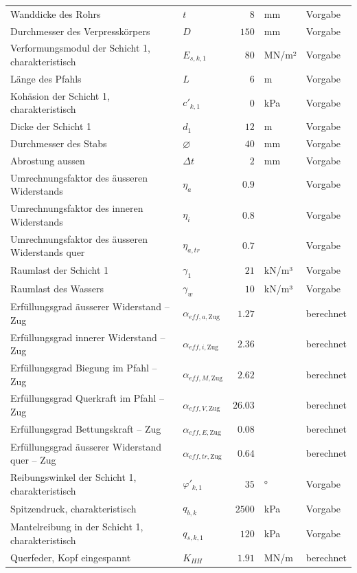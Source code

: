 \documentclass[11pt,a4paper]{article}
\begin{document}
\begin{xltabular}{\linewidth}{>{\raggedright\arraybackslash}Xlrll}
Wanddicke des Rohrs & $t$ & $8$ & mm & Vorgabe \\
Durchmesser des Verpresskörpers & $D$ & $150$ & mm & Vorgabe \\
Verformungsmodul der Schicht 1, charakteristisch & $E_{s,k,1}$ & $80$ & MN/m² & Vorgabe \\
Länge des Pfahls & $L$ & $6$ & m & Vorgabe \\
Kohäsion der Schicht 1, charakteristisch & $c'_{k,1}$ & $0$ & kPa & Vorgabe \\
Dicke der Schicht 1 & $d_{1}$ & $12$ & m & Vorgabe \\
Durchmesser des Stabs & $\varnothing$ & $40$ & mm & Vorgabe \\
Abrostung aussen & $\Delta t$ & $2$ & mm & Vorgabe \\
Umrechnungsfaktor des äusseren Widerstands & $\eta_a$ & $0.9$ &  & Vorgabe \\
Umrechnungsfaktor des inneren Widerstands & $\eta_i$ & $0.8$ &  & Vorgabe \\
Umrechnungsfaktor des äusseren Widerstands quer & $\eta_{a,tr}$ & $0.7$ &  & Vorgabe \\
Raumlast der Schicht 1 & $\gamma_{1}$ & $21$ & kN/m³ & Vorgabe \\
Raumlast des Wassers & $\gamma_w$ & $10$ & kN/m³ & Vorgabe \\
Erfüllungsgrad äusserer Widerstand – Zug & $\alpha_{eff,a,\text{Zug}}$ & $1.27$ &  & berechnet \\
Erfüllungsgrad innerer Widerstand – Zug & $\alpha_{eff,i,\text{Zug}}$ & $2.36$ &  & berechnet \\
Erfüllungsgrad Biegung im Pfahl – Zug & $\alpha_{eff,M,\text{Zug}}$ & $2.62$ &  & berechnet \\
Erfüllungsgrad Querkraft im Pfahl – Zug & $\alpha_{eff,V,\text{Zug}}$ & $26.03$ &  & berechnet \\
Erfüllungsgrad Bettungskraft – Zug & $\alpha_{eff,E,\text{Zug}}$ & $0.08$ &  & berechnet \\
Erfüllungsgrad äusserer Widerstand quer – Zug & $\alpha_{eff,tr,\text{Zug}}$ & $0.64$ &  & berechnet \\
Reibungswinkel der Schicht 1, charakteristisch & $\varphi'_{k,1}$ & $35$ & ° & Vorgabe \\
Spitzendruck, charakteristisch & $q_{b,k}$ & $2500$ & kPa & Vorgabe \\
Mantelreibung in der Schicht 1, charakteristisch & $q_{s,k,1}$ & $120$ & kPa & Vorgabe \\
Querfeder, Kopf eingespannt & $K_{HH}$ & $1.91$ & MN/m & berechnet \\

\end{xltabular}
\end{document}
